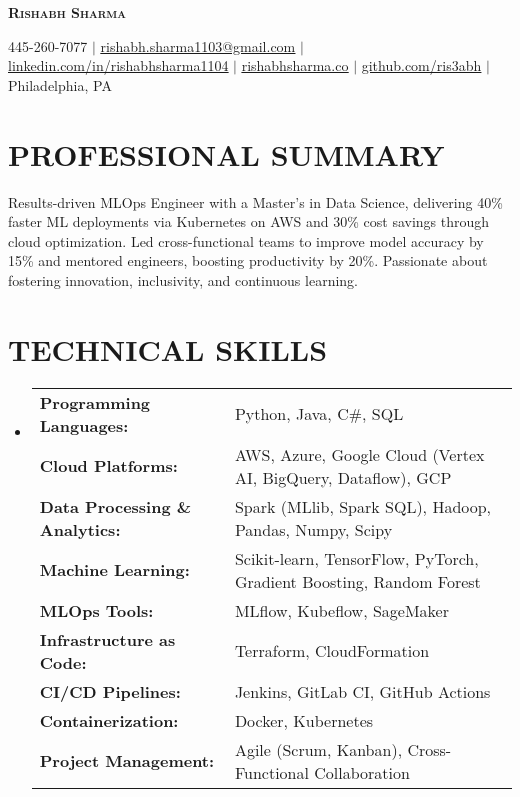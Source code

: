 \documentclass[letterpaper,10pt]{article}
\newcommand{\resumeItem}[1]{
  \item\small{
    {#1 \vspace{-1.5pt}}
  }
}
\newcommand{\resumeSubHeadingListStart}{\begin{itemize}[leftmargin=0.15in, label={}]}
\newcommand{\resumeSubHeadingListEnd}{\end{itemize}}
\begin{document}
\begin{center}
    \textbf{\Huge \scshape Rishabh Sharma}
\end{center}
\begin{center}
    \small
    445-260-7077 $|$
    \href{mailto:rishabh.sharma1103@gmail.com}{\underline{rishabh.sharma1103@gmail.com}} $|$
    \href{https://www.linkedin.com/in/rishabhsharma1104/}{\underline{linkedin.com/in/rishabhsharma1104}} $|$
    \href{https://www.rishabhsharma.co/}{\underline{rishabhsharma.co}} $|$
    \href{https://github.com/ris3abh}{\underline{github.com/ris3abh}} $|$
    Philadelphia, PA
\end{center}

\section{PROFESSIONAL SUMMARY}  
Results-driven MLOps Engineer with a Master’s in Data Science, delivering 40\% faster ML deployments via Kubernetes on AWS and 30\% cost savings through cloud optimization. Led cross-functional teams to improve model accuracy by 15\% and mentored engineers, boosting productivity by 20\%. Passionate about fostering innovation, inclusivity, and continuous learning.

\section{TECHNICAL SKILLS}
\resumeSubHeadingListStart
\resumeItem{
{\fontsize{9}{11}\selectfont
\begin{tabularx}{\textwidth}{@{} l X @{}}
\textbf{Programming Languages:} & Python, Java, C#, SQL \\
\textbf{Cloud Platforms:} & AWS, Azure, Google Cloud (Vertex AI, BigQuery, Dataflow), GCP \\
\textbf{Data Processing \& Analytics:} & Spark (MLlib, Spark SQL), Hadoop, Pandas, Numpy, Scipy \\
\textbf{Machine Learning:} & Scikit-learn, TensorFlow, PyTorch, Gradient Boosting, Random Forest \\
\textbf{MLOps Tools:} & MLflow, Kubeflow, SageMaker \\
\textbf{Infrastructure as Code:} & Terraform, CloudFormation \\
\textbf{CI/CD Pipelines:} & Jenkins, GitLab CI, GitHub Actions \\
\textbf{Containerization:} & Docker, Kubernetes \\
\textbf{Project Management:} & Agile (Scrum, Kanban), Cross-Functional Collaboration \\
\end{tabularx}
}
}
\resumeSubHeadingListEnd
\end{document}
